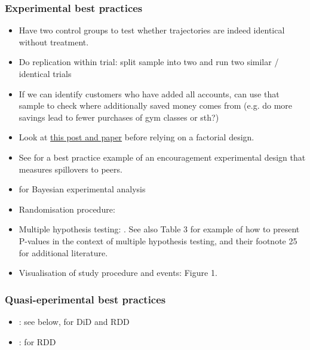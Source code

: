 \documentclass[a4paper, 11pt]{report}
\begin{document}
\subsubsection*{Experimental best practices}
\begin{itemize}
	\item Have two control groups to test whether trajectories are indeed identical without treatment.

	\item Do replication within trial: split sample into two and run two similar / identical trials \citep{hershfield2019temporal}

	\item If we can identify customers who have added all accounts, can use that sample to check where additionally saved money comes from (e.g. do more savings lead to fewer purchases of gym classes or sth?)

	\item Look at \href{https://blogs.worldbank.org/impactevaluations/be-careful-inference-2x2-experiments-and-other-cross-cutting-designs}{this post and paper} before relying on a factorial design.

	\item See \citet{duflO2003role} for a best practice example of an encouragement experimental design that measures spillovers to peers.

	\item \citet{dehejia2005program} for Bayesian experimental analysis

	\item Randomisation procedure: \citet{bruhn2009pursuit}

	\item Multiple hypothesis testing: \citet{list2019multiple}. See also \citet{blumenstock2018defaults} Table 3 for example of how to present P-values in the context of multiple hypothesis testing, and their footnote 25 for additional literature.

	\item Visualisation of study procedure and events: \citet{blumenstock2018defaults} Figure 1.
\end{itemize}

\subsubsection*{Quasi-eperimental best practices}
\begin{itemize}
	\item \citet{melnikov2019gangs}: see below, for DiD and RDD
	\item \citet{middleton2018lifting}: for RDD
\end{itemize}
\end{document}
